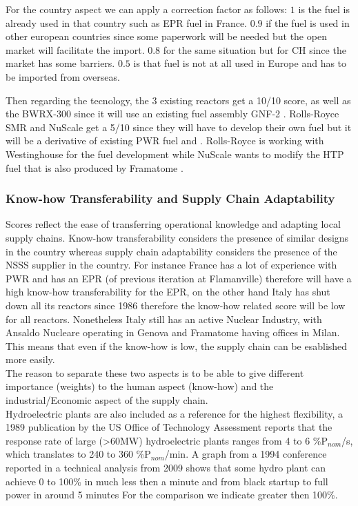 For the country aspect we can apply a correction factor as follows: 
$1$ is the fuel is already used in that country such as EPR fuel in France. $0.9$ if the fuel is used in other european countries since some paperwork will be needed but the open market will facilitate the import. $0.8$ for the same situation but for CH since the market has some barriers. $0.5$ is that fuel is not at all used in Europe and has to be imported from overseas.

Then regarding the tecnology, the 3 existing reactors get a 10/10 score, as well as the BWRX-300 since it will use an existing fuel assembly GNF-2 \cite{CNSC_BWRX300_Fuel_Design}. Rolls-Royce SMR and NuScale get a 5/10 since they will have to develop their own fuel but it will be a derivative of existing PWR fuel \cite{RollsRoyce_SMR_UK_Fuel_2023} and \cite{NRC_ML17007A001}. Rolls-Royce is working with Westinghouse for the fuel development \cite{PLACEHOLDER} while NuScale wants to modify the HTP\texttrademark{} fuel that is also produced by Framatome \cite{Framatome_GNF2_Fuel_2018}.

\subsubsection{Know-how Transferability and Supply Chain Adaptability}
Scores reflect the ease of transferring operational knowledge and adapting local supply chains. Know-how transferability considers the presence of similar designs in the country whereas supply chain adaptability considers the presence of the NSSS supplier in the country. For instance France has a lot of experience with PWR and has an EPR (of previous iteration at Flamanville) therefore will have a high know-how transferability for the EPR, on the other hand Italy has shut down all its reactors since 1986 therefore the know-how related score will be low for all reactors. Nonetheless Italy still has an active Nuclear Industry, with Ansaldo Nucleare operating in Genova and Framatome having offices in Milan. This means that even if the know-how is low, the supply chain can be esablished more easily. \\

The reason to separate these two aspects is to be able to give different importance (weights) to the human aspect (know-how) and the industrial/Economic aspect of the supply chain. \\


Hydroelectric plants are also included as a reference for the highest flexibility, a 1989 publication by the US Office of Technology Assessment \cite{OTA_Electric_Power_Wheeling_1989} reports that the response rate of large (>60MW) hydroelectric plants ranges from 4 to 6 \%P$_{nom}$/s, which translates to 240 to 360 \%P$_{nom}$/min. A graph from a 1994 conference reported in a technical analysis from 2009 shows that some hydro plant can achieve 0 to 100\% in much less then a minute and from black startup to full power in around 5 minutes For the comparison we indicate greater then 100\%. \cite{osti_219975, MWH_Pumped_Storage_Wind_2009}

